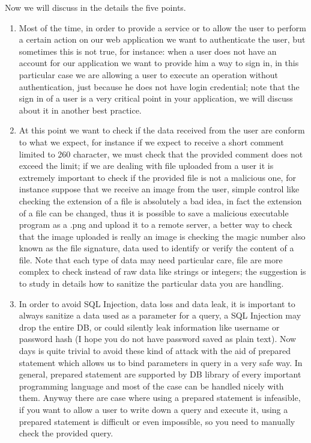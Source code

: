 Now we will discuss in the details the five points.\newline

\begin{enumerate}
	\item	Most of the time, in order to provide a service or to allow the user to perform a certain action on our web application we want to authenticate the user, but sometimes this is not true, for instance: when a user does not have an account for our application we want to provide him a way to sign in, in this particular case we are allowing a user to execute an operation without authentication, just because he does not have login credential; note that the sign in of a user is a very critical point in your application, we will discuss about it in another best practice.
	\item At this point we want to check if the data received from the user are conform to what we expect, for instance if we expect to receive a short comment limited to 260 character, we must check that the provided comment does not exceed the limit; if we are dealing with file uploaded from a user it is extremely important to check if the provided file is not a malicious one, for instance suppose that we receive an image from the user, simple control like checking the extension of a file is absolutely a bad idea, in fact the extension of a file can be changed, thus it is possible to save a malicious executable program as a .png and upload it to a remote server, a better way to check that the image uploaded is really an image is checking the magic number also known as the file signature, data used to identify or verify the content of a file.
	Note that each type of data may need particular care, file are more complex to check instead of raw data like strings or integers; the suggestion is to study in details how to sanitize the particular data you are handling.
	\item In order to avoid SQL Injection, data loss and data leak, it is important to always sanitize a data used as a parameter for a query, a SQL Injection may drop the entire DB, or could silently leak information like username or password hash (I hope you do not have password saved as plain text). Now days is quite trivial to avoid these kind of attack with the aid of prepared statement which allows us to bind parameters in query in a very safe way.
	In general, prepared statement are supported by DB library of every important programming language and most of the case can be handled nicely with them.
	Anyway there are case where using a prepared statement is infeasible, if you want to allow a user to write down a query and execute it, using a prepared statement is difficult or even impossible, so you need to manually check the provided query.

\end{enumerate}
